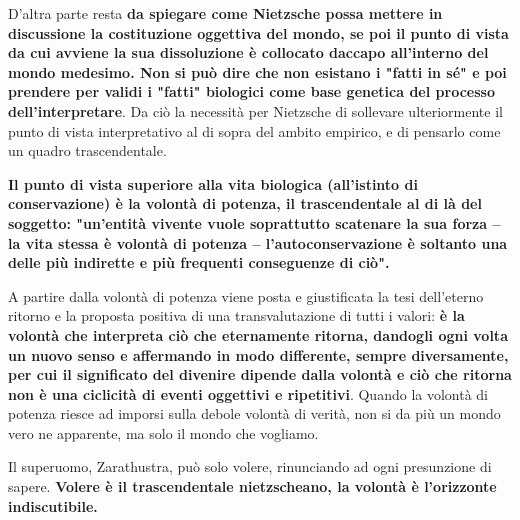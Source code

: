 D'altra parte resta \textbf{da spiegare come Nietzsche possa mettere in discussione la costituzione oggettiva del mondo, se poi il punto di vista da cui avviene la sua dissoluzione è collocato daccapo all'interno del mondo medesimo. Non si può dire che non esistano i "fatti in sé" e poi prendere per validi i "fatti" biologici come base genetica del processo dell'interpretare}. Da ciò la necessità per Nietzsche di sollevare  ulteriormente il punto di vista interpretativo al di sopra del ambito empirico, e di pensarlo come un quadro trascendentale.

\textbf{Il punto di vista superiore alla vita biologica (all'istinto di conservazione) è la volontà di potenza, il trascendentale al di là del soggetto: "un'entità vivente vuole soprattutto scatenare la sua forza -- la vita stessa è volontà di potenza -- l'autoconservazione è soltanto una delle più indirette e più frequenti conseguenze di ciò".}

A partire dalla volontà di potenza viene posta e giustificata la tesi dell'eterno ritorno e la proposta positiva di una transvalutazione di tutti i valori: \textbf{è la volontà che interpreta ciò che eternamente ritorna, dandogli ogni volta un nuovo senso e affermando in modo differente, sempre diversamente, per cui il significato del divenire dipende dalla volontà e ciò che ritorna non è una ciclicità di eventi oggettivi e ripetitivi}. Quando la volontà di potenza riesce ad imporsi sulla debole volontà di verità, non si da più un mondo vero ne apparente, ma solo il mondo che vogliamo.

Il superuomo, Zarathustra, può solo volere, rinunciando ad ogni presunzione di  sapere. \textbf{Volere è il trascendentale nietzscheano, la volontà è l'orizzonte indiscutibile.}


























